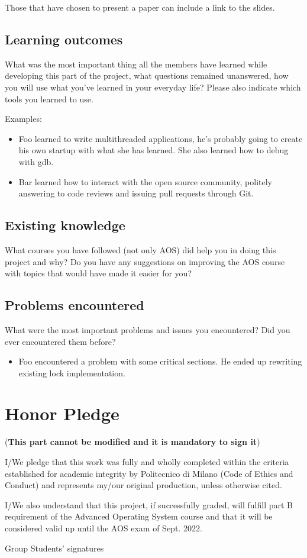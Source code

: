 \documentclass[10pt,a4]{article}
\begin{document}
Those that have chosen to present a paper can include a link to the slides.

\subsection{Learning outcomes}

What was the most important thing all the members have learned while
developing this part of the project, what questions remained unanswered,
how you will use what you've learned in your everyday life?
Please also indicate which tools you learned to use.

Examples:

\begin{itemize}
\item Foo learned to write multithreaded applications, he's probably going to
  create his own startup with what she has learned. She also learned how to
  debug with gdb.
\item Bar learned how to interact with the open source community, politely
  answering to code reviews and issuing pull requests through Git.
\end{itemize}

\subsection{Existing knowledge}
What courses you have followed (not only AOS) did help you in doing this project
and why? Do you have any suggestions on improving the AOS course with topics
that would have made it easier for you?

\subsection{Problems encountered}
What were the most important problems and issues you encountered? Did you ever
encountered them before? 

\begin{itemize}
\item Foo encountered a problem with some critical sections. He ended up
  rewriting existing lock implementation.
\end{itemize}

\section{Honor Pledge}
(\textbf{This part cannot be modified and it is mandatory to sign it})

I/We pledge that this work was fully and wholly completed within the criteria
established for academic integrity by Politecnico di Milano (Code of Ethics and
Conduct) and represents my/our original production, unless otherwise cited.

I/We also understand that this project, if successfully graded,  will fulfill part B requirement of the
Advanced Operating System course and that it will be considered valid up until
the AOS exam of Sept. 2022. 

\begin{flushright}
Group Students' signatures
\end{flushright}
\end{document}
